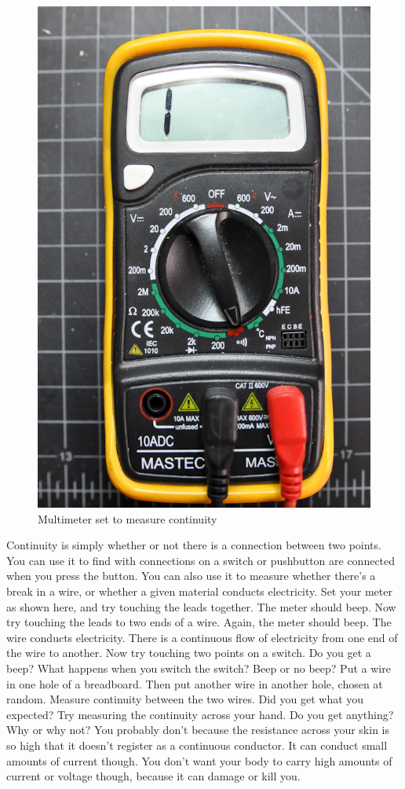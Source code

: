 \begin{figure}[!htb]
 \centering
 \includegraphics[scale=0.3]{img/electronics/multimeter_continuity.jpg}
 \caption{Multimeter set to measure continuity}
 \label{Multimeter set to measure continuity}
\end{figure}

Continuity is simply whether or not there is a connection between two points. You can use it to find with connections on a switch or pushbutton are connected when you press the button. You can also use it to measure whether there's a break in a wire, or whether a given material conducts electricity. Set your meter as shown here, and try touching the leads together. The meter should beep.
Now try touching the leads to two ends of a wire. Again, the meter should beep. The wire conducts electricity. There is a continuous flow of electricity from one end of the wire to another.
Now try touching two points on a switch. Do you get a beep? What happens when you switch the switch? Beep or no beep?
Put a wire in one hole of a breadboard. Then put another wire in another hole, chosen at random. Measure continuity between the two wires. Did you get what you expected?
Try measuring the continuity across your hand. Do you get anything? Why or why not? You probably don't because the resistance across your skin is so high that it doesn't register as a continuous conductor. It can conduct small amounts of current though. You don't want your body to carry high amounts of current or voltage though, because it can damage or kill you.

